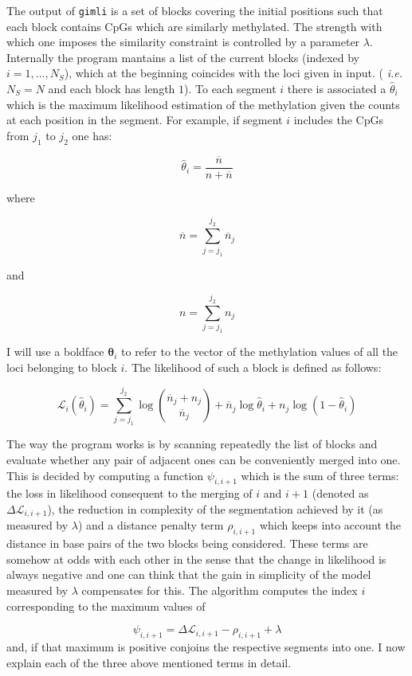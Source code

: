 \documentclass[12pt]{amsart}
\newcommand{\lik}{\ensuremath{\mathcal{L}}}
\newcommand{\gimli}{\texttt{gimli}}
\newcommand{\ie}{\textit{i.e.}}
\begin{document}
The output of \gimli{} is a set of blocks 
covering the initial positions 
such that each block contains CpGs which are similarly
methylated. The strength with which
one imposes the similarity constraint
is controlled by a parameter $\lambda$.
Internally the program  mantains a list of the current  
blocks (indexed by $i=1,\dots,N_S$), 
which at the beginning 
coincides with the loci given in input. 
( \ie{}  $N_S=N$ and each block has length $1$). 
To each segment $i$ there is associated a $\hat{\theta}_i$ which
is the maximum likelihood estimation of the methylation given the counts
at each position in the segment. 
For example, if segment $i$ includes the CpGs from $j_1$ to $j_2$
one has:

\[
\hat{\theta}_i=\frac{\overline{n}}{n + \overline{n}}
\]

where

\[
\overline{n}=\sum_{j=j_1}^{j_2} \overline{n}_j
\]

and

\[
n=\sum_{j=j_1}^{j_2} n_j
\]

I will use a boldface
$\pmb{\theta}_i$ to refer to the vector of the methylation values 
of all the loci belonging to 
block $i$.  
The likelihood of such a block is defined as follows:

\begin{equation}
\lik_i(\hat{\theta}_i)=\sum_{j=j_1}^{j_2} 
\log {\overline{n}_j+n_j \choose \overline{n}_j} +
	{\overline{n}_j}\log\hat{\theta}_i+
	n_j\log(1-\hat{\theta}_i)
\end{equation}
\label{loglik}

The way the program works is by 
scanning repeatedly the list of blocks and evaluate whether any pair 
of adjacent ones can be conveniently merged into one.  
This is decided by computing a function $\psi_{i,i+1}$ which is the sum of three terms:
the loss in likelihood consequent to the merging of $i$ and $i+1$ (denoted as $\Delta  \lik_{i,i+1}$),
the reduction in complexity of the segmentation achieved by it (as measured by $\lambda$)
and a distance penalty term $\rho_{i,i+1}$ which keeps into account the distance in base pairs of the two blocks
being considered. These terms are somehow at odds with each other in the
sense that the change in likelihood is always negative and one can think
that the gain in simplicity of the model measured by $\lambda$ 
compensates for this.
The algorithm computes the index $i$ corresponding to the maximum
values of 

\begin{equation}
\psi_{i,i+1} =  \Delta  \lik_{i,i+1}  - \rho_{i,i+1}  +\lambda
\end{equation}
and, if that maximum is positive conjoins the respective segments into one.
I now explain each of the three above mentioned terms in detail.
\end{document}

